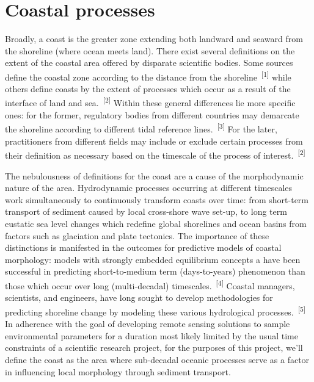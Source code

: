 \documentclass{article}
\begin{document}
\newpage
{}
\fancyfoot[C]{\thepage} 
\thispagestyle{fancy}
\setcounter{page}{1}

\section{Coastal processes}
\par{\hspace{.5cm}Broadly, a coast is the greater zone extending both landward and seaward from the shoreline (where ocean meets land). There exist several definitions on the extent of the coastal area offered by disparate scientific bodies. Some sources define the coastal zone according to the distance from the shoreline~\textsuperscript{[1]} while others define coasts by the extent of processes which occur as a result of the interface of land and sea.~\textsuperscript{[2]} Within these general differences lie more specific ones: for the former, regulatory bodies from different countries may demarcate the shoreline according to different tidal reference lines.~\textsuperscript{[3]} For the later, practitioners from different fields may include or exclude certain processes from their definition as necessary based on the timescale of the process of interest.~\textsuperscript{[2]}}

\par{The nebulousness of definitions for the coast are a cause of the morphodynamic nature of the area. Hydrodynamic processes occurring at different timescales work simultaneously to continuously transform coasts over time: from short-term transport of sediment caused by local cross-shore wave set-up, to long term eustatic sea level changes which redefine global shorelines and ocean basins from factors such as glaciation and plate tectonics. The importance of these distinctions is manifested in the outcomes for predictive models of coastal morphology: models with strongly embedded equilibrium concepts a have been successful in predicting short-to-medium term (days-to-years) phenomenon than those which occur over long (multi-decadal) timescales.~\textsuperscript{[4]} Coastal managers, scientists, and engineers, have long sought to develop methodologies for predicting shoreline change by modeling these various hydrological processes.~\textsuperscript{[5]} In adherence with the goal of developing remote sensing solutions to sample environmental parameters for a duration most likely limited by the usual time constraints of a scientific research project, for the purposes of this project, we'll define the coast as the area where sub-decadal oceanic processes serve as a factor in influencing local morphology through sediment transport.}
\end{document}
